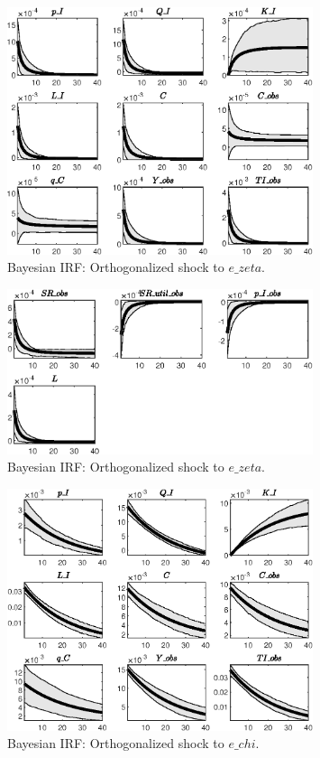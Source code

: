 \begin{figure}[H]
\centering 
\includegraphics[width=0.80\textwidth]{directed_search/Output/directed_search_Bayesian_IRF_e_zeta_1}
\caption{Bayesian IRF: Orthogonalized shock to $e\_zeta$.}
\label{Fig:BayesianIRF:e_zeta:1}
\end{figure}
 
\begin{figure}[H]
\centering 
\includegraphics[width=0.80\textwidth]{directed_search/Output/directed_search_Bayesian_IRF_e_zeta_2}
\caption{Bayesian IRF: Orthogonalized shock to $e\_zeta$.}
\label{Fig:BayesianIRF:e_zeta:2}
\end{figure}
 
\begin{figure}[H]
\centering 
\includegraphics[width=0.80\textwidth]{directed_search/Output/directed_search_Bayesian_IRF_e_chi_1}
\caption{Bayesian IRF: Orthogonalized shock to $e\_chi$.}
\label{Fig:BayesianIRF:e_chi:1}
\end{figure}
 
